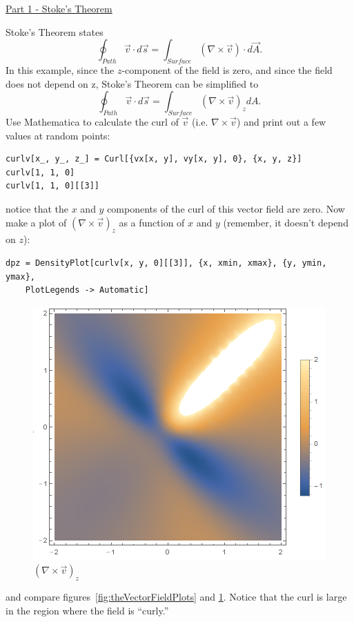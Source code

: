 
\underline{Part 1 - Stoke's Theorem}
\hfill \break

Stoke's Theorem states
%
\begin{equation}
\label{eq:stokesTheorem}
\oint_{Path} \vec{v} \cdot d\vec{s} = \int_{Surface} \left( \nabla \times \vec{v} \right) \cdot d\vec{A}.
\end{equation}
%
In this example, since the $z$-component of the field is zero, and since the field does not depend on z, Stoke's Theorem can be simplified to
%
\begin{equation}
\label{eq:stokesTheoremSimplified}
\oint_{Path} \vec{v} \cdot d\vec{s} = \int_{Surface} \left( \nabla \times \vec{v} \right)_z dA.
\end{equation}
%
Use Mathematica to calculate the curl of $\vec{v}$ (i.e. $\nabla \times \vec{v}$) and print out a few values at random points:
\begin{verbatim}
curlv[x_, y_, z_] = Curl[{vx[x, y], vy[x, y], 0}, {x, y, z}]
curlv[1, 1, 0]
curlv[1, 1, 0][[3]]
\end{verbatim}
notice that the $x$ and $y$ components of the curl of this vector field are zero.
Now make a plot of $\left( \nabla \times \vec{v} \right)_z$ as a function of $x$ and $y$ (remember, it doesn't depend on $z$):
\begin{verbatim}
dpz = DensityPlot[curlv[x, y, 0][[3]], {x, xmin, xmax}, {y, ymin, ymax},
	PlotLegends -> Automatic]
\end{verbatim}
%
\begin{figure}[!h]
\centering
\includegraphics[scale=0.7]{figures/stokes-theorem/curlzDensityPlot.png}
\caption{$\left( \nabla \times \vec{v} \right)_z$}
\label{fig:curlzDensityPlot}
\end{figure}
%
and compare figures~\ref{fig:theVectorFieldPlots} and \ref{fig:curlzDensityPlot}.
Notice that the curl is large in the region where the field is ``curly.''

